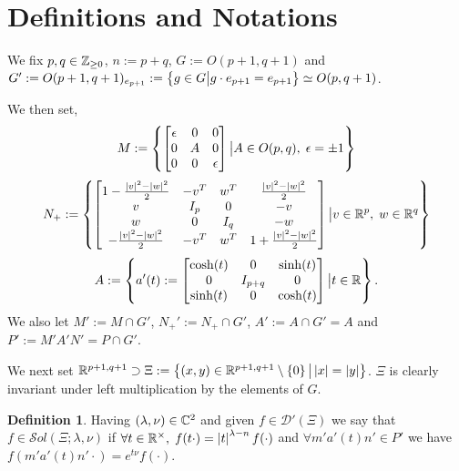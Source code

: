 \documentclass[10pt]{article} %
\title{}
\author{Alex Leontiev}
\newcommand{\D}{\mathcal{D}}
\theoremstyle{definition}
\newtheorem{mydef}{Definition}[section]
\theoremstyle{remark}
\begin{document}
\newcommand{\sone}{$\mybra{\D'(G\times_P\C_{\lambda-n})\otimes\C_\nu}^{\Delta(P')}$}
\newcommand{\Upp}{\mysetn{(x,y)\in\R^{p,q}}{x\neq0,\;y\neq0}}
\newcommand{\Stab}{O(p,q)_{e_p}}
\newcommand{\sol}[1][\R^{p,q}]{\mathcal{S}ol(#1;\lambda,\nu)}
\newcommand{\solXi}{\sol[\Xi]}
\maketitle
\section{Definitions and Notations}
We fix $p,q\in\mathbb{Z}_{\geq0}$, $n:=p+q$, $G:=O(p+1,q+1)$ and $G':=O(p+1,q+1)_{e_{p+1}}:=\left\{g\in G\big| g\cdot e_{p+1}=e_{p+1}\right\}\simeq
O(p,q+1)$.

We then set,
\[M:=\left\{ \begin{bmatrix}\epsilon&0&0\\0&A&0\\0&0&\epsilon\end{bmatrix}\big| A\in O(p,q),\;\epsilon=\pm1\right\}\]
\[N_+:=\left\{
\begin{bmatrix}
	1-\frac{ \left| v \right|^2-\left| w \right|^2 }{2}&-v^T&w^T&\frac{ \left| v \right|^2-\left| w \right|^2 }{2}\\
	v&I_{ p }&0&-v\\w&0&I_q&-w\\-\frac{ \left| v \right|^2-\left| w \right|^2 }{2}&-v^T&w^T&1+\frac{ \left| v \right|^2-\left| w \right|^2 }{2}\\
\end{bmatrix}\big| v\in\mathbb{R}^p,\;w\in\mathbb{R}^q\right\}\]
\[A:=\left\{a'(t):= 
	\begin{bmatrix}
		\cosh(t)&0&\sinh(t)\\0&I_{ p+q }&0\\\sinh(t)&0&\cosh(t)
	\end{bmatrix}
\big| t\in\mathbb{R}\right\}.\]
We also let $M':=M\cap G'$, $N_+':=N_+\cap G'$, $A':=A\cap G'=A$ and $P':=M'A'N'=P\cap G'$.

We next set $\mathbb{R}^{ p+1,q+1 }\supset\Xi:=\left\{ (x,y)\in\mathbb{R}^{ p+1,q+1 }\setminus \left\{ 0 \right\}\big| \left|x\right|=\left|y\right|\right\}$.
$\Xi$ is clearly invariant under left multiplication by the elements of $G$.
\begin{mydef}
	Having $(\lambda,\nu)\in\mathbb{C}^2$ and given $f\in \D'(\Xi)$ we say that $f\in\solXi$
	if $\forall t\in\mathbb{R}^\times,\;f(t\cdot)=\left|t\right|^{\lambda-n}f(\cdot)$ and 
	$\forall m'a'(t)n'\in P'$
	we have $f(m'a'(t)n'\cdot)=e^{ t\nu }f(\cdot)$.
\end{mydef}
\end{document}
